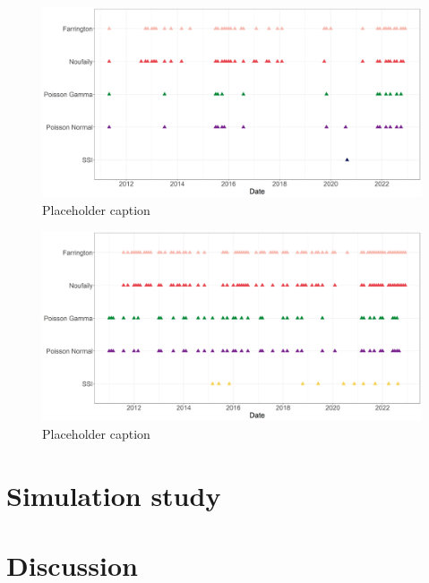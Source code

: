 \documentclass[a4paper,twoside,11pt]{report} %
\theoremstyle{definition}
\theoremstyle{definition}
\theoremstyle{definition}
\theoremstyle{definition}
\theoremstyle{remark}
\begin{document}
\begin{figure}[H]
\includegraphics[width=1\linewidth]{../figures/Compare_alarms_SHIG} \caption{Placeholder caption}\label{fig:CompareAlarmsSHIG}
\end{figure}



\begin{figure}[H]
\includegraphics[width=1\linewidth]{../figures/Compare_alarms_SALM} \caption{Placeholder caption}\label{fig:CompareAlarmsSALM}
\end{figure}

\cleardoublepage

\chapter{Simulation study}

\blindtext

\blindtext

\cleardoublepage

\chapter{Discussion}

\blindtext
\end{document}
